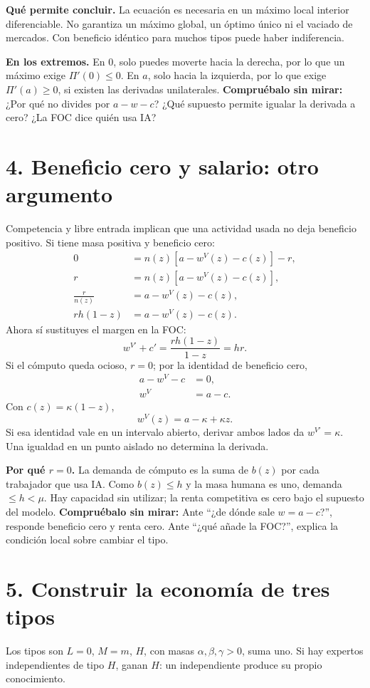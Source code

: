 \documentclass[11pt]{article}
\newcommand{\pregunta}[1]{\medskip\textbf{Compruébalo sin mirar:} #1\par}
\begin{document}
\textbf{Qué permite concluir.} La ecuación es necesaria en un máximo local interior diferenciable. No garantiza un máximo global, un óptimo único ni el vaciado de mercados. Con beneficio idéntico para muchos tipos puede haber indiferencia.

\textbf{En los extremos.} En $0$, solo puedes moverte hacia la derecha, por lo que un máximo exige $\Pi'(0)\leq0$. En $a$, solo hacia la izquierda, por lo que exige $\Pi'(a)\geq0$, si existen las derivadas unilaterales.
\pregunta{¿Por qué no divides por $a-w-c$? ¿Qué supuesto permite igualar la derivada a cero? ¿La FOC dice quién usa IA?}
\newpage
\section*{4. Beneficio cero y salario: otro argumento}
Competencia y libre entrada implican que una actividad usada no deja beneficio positivo. Si tiene masa positiva y beneficio cero:
\begin{align*}
0&=n(z)[a-w^V(z)-c(z)]-r,\\
r&=n(z)[a-w^V(z)-c(z)],\\
\frac r{n(z)}&=a-w^V(z)-c(z),\\
rh(1-z)&=a-w^V(z)-c(z).
\end{align*}
Ahora sí sustituyes el margen en la FOC:
\[
w^{V\prime}+c'=\frac{rh(1-z)}{1-z}=hr.
\]
Si el cómputo queda ocioso, $r=0$; por la identidad de beneficio cero,
\begin{align*}
a-w^V-c&=0,\\
w^V&=a-c.
\end{align*}
Con $c(z)=\kappa(1-z)$,
\[
w^V(z)=a-\kappa+\kappa z.
\]
Si esa identidad vale en un intervalo abierto, derivar ambos lados da $w^{V\prime}=\kappa$. Una igualdad en un punto aislado no determina la derivada.

\textbf{Por qué $r=0$.} La demanda de cómputo es la suma de $b(z)$ por cada trabajador que usa IA. Como $b(z)\leq h$ y la masa humana es uno, demanda $\leq h<\mu$. Hay capacidad sin utilizar; la renta competitiva es cero bajo el supuesto del modelo.
\pregunta{Ante ``¿de dónde sale $w=a-c$?'', responde beneficio cero y renta cero. Ante ``¿qué añade la FOC?'', explica la condición local sobre cambiar el tipo.}
\newpage
\section*{5. Construir la economía de tres tipos}
Los tipos son $L=0$, $M=m$, $H$, con masas $\alpha,\beta,\gamma>0$, suma uno. Si hay expertos independientes de tipo $H$, ganan $H$: un independiente produce su propio conocimiento.
\end{document}
